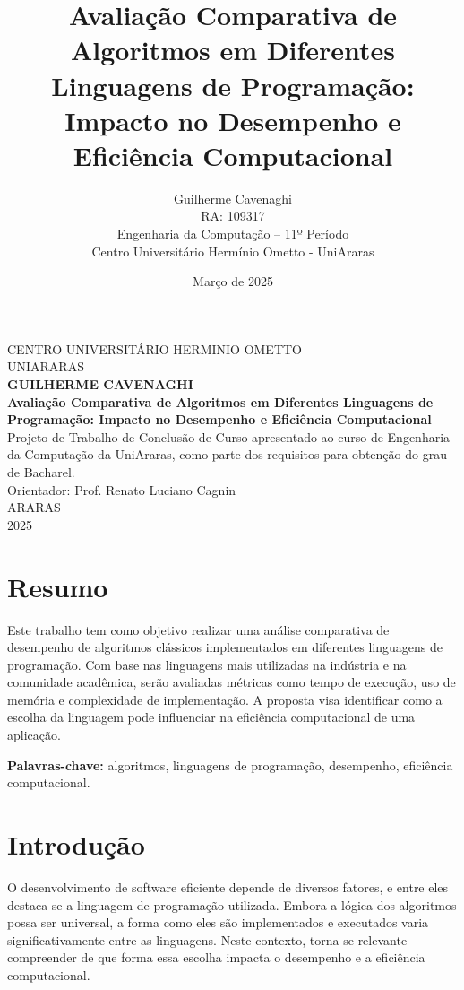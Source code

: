 \documentclass[12pt,oneside,a4paper]{report}
\title{\textbf{Avaliação Comparativa de Algoritmos em Diferentes Linguagens de Programação: Impacto no Desempenho e Eficiência Computacional}}
\author{Guilherme Cavenaghi \\ RA: 109317 \\ Engenharia da Computação -- 11º Período \\ Centro Universitário Hermínio Ometto - UniAraras}
\date{Março de 2025}
\begin{document}
\begin{titlepage}
    \begin{center}
        \large
        CENTRO UNIVERSITÁRIO HERMINIO OMETTO\\
        UNIARARAS\\[1.5cm]

        \textbf{GUILHERME CAVENAGHI}\\[5cm]

        \textbf{\Large Avaliação Comparativa de Algoritmos em Diferentes Linguagens de Programação: Impacto no Desempenho e Eficiência Computacional}\\[1.5cm]

        Projeto de Trabalho de Conclusão de Curso apresentado ao curso de Engenharia da Computação da UniAraras, como parte dos requisitos para obtenção do grau de Bacharel.\\[0.5cm]

        Orientador: Prof. Renato Luciano Cagnin\\[3cm]

        ARARAS\\
        2025
    \end{center}
\end{titlepage}

\chapter*{Resumo}
Este trabalho tem como objetivo realizar uma análise comparativa de desempenho de algoritmos clássicos implementados em diferentes linguagens de programação. Com base nas linguagens mais utilizadas na indústria e na comunidade acadêmica, serão avaliadas métricas como tempo de execução, uso de memória e complexidade de implementação. A proposta visa identificar como a escolha da linguagem pode influenciar na eficiência computacional de uma aplicação.

\textbf{Palavras-chave:} algoritmos, linguagens de programação, desempenho, eficiência computacional.


\chapter{Introdução}
O desenvolvimento de software eficiente depende de diversos fatores, e entre eles destaca-se a linguagem de programação utilizada. Embora a lógica dos algoritmos possa ser universal, a forma como eles são implementados e executados varia significativamente entre as linguagens. Neste contexto, torna-se relevante compreender de que forma essa escolha impacta o desempenho e a eficiência computacional.
\end{document}
